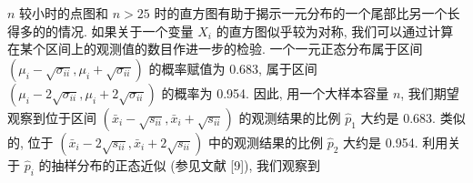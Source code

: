 
$n$ 较小时的点图和 $n>25$ 时的直方图有助于揭示一元分布的一个尾部比另一个长得多的的情况. 如果关于一个变量 $X_{i}$ 的直方图似乎较为对称, 我们可以通过计算在某个区间上的观测值的数目作进一步的检验. 一个一元正态分布属于区间 $(\mu_{i}-\sqrt{\sigma_{ii}},\mu_{i}+\sqrt{\sigma_{ii}})$ 的概率赋值为 0.683, 属于区间 $(\mu_{i}-2\sqrt{\sigma_{ii}},\mu_{i}+2\sqrt{\sigma_{ii}})$ 的概率为 0.954. 因此, 用一个大样本容量 $n$, 我们期望观察到位于区间 $(\bar{x}_{i}-\sqrt{s_{ii}},\bar{x}_{i}+\sqrt{s_{ii}})$ 的观测结果的比例 $\hat{p}_{1}$ 大约是 0.683. 类似的, 位于 $(\bar{x}_{i}-2\sqrt{s_{ii}},\bar{x}_{i}+2\sqrt{s_{ii}})$ 中的观测结果的比例 $\hat{p}_{2}$ 大约是 0.954. 利用关于 $\hat{p}_{i}$ 的抽样分布的正态近似 (参见文献 [9]), 我们观察到
